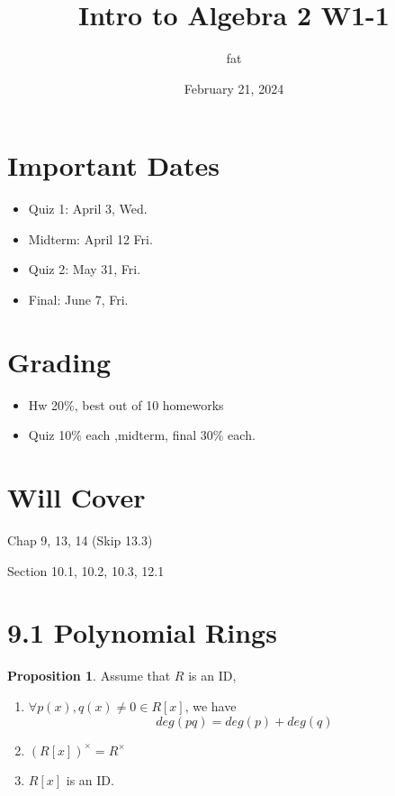 \documentclass{article}
\title{Intro to Algebra 2 W1-1}
\author{fat}
\date{February 21, 2024}
\theoremstyle{definition}
\newtheorem{prop}{Proposition}
\begin{document}
\maketitle
\thispagestyle{fancy}
\renewcommand{\footrulewidth}{0.4pt}
\cfoot{\thepage}
\renewcommand{\headrulewidth}{0.4pt}

\section*{Important Dates}

\begin{itemize}
  \item Quiz 1: April 3, Wed. 
  \item Midterm: April 12 Fri. 
  \item Quiz 2: May 31, Fri. 
  \item Final: June 7, Fri. 
\end{itemize}

\section*{Grading}

\begin{itemize}
  \item Hw 20\%, best out of 10 homeworks
  \item Quiz 10\% each ,midterm, final 30\% each. 
\end{itemize}

\section*{Will Cover}

\par Chap 9, 13, 14 (Skip 13.3)

\par Section 10.1, 10.2, 10.3, 12.1

\section{9.1 Polynomial Rings}

\begin{prop}
  Assume that $R$ is an ID, 
  \begin{enumerate}
    \item $\forall p(x), q(x) \neq 0 \in R[x]$, we have 
      $$deg(pq) = deg(p) + deg(q)$$
    \item $(R[x])^\times = R^\times$ 
    \item $R[x]$ is an ID.
  \end{enumerate}
\end{prop}
\end{document}
